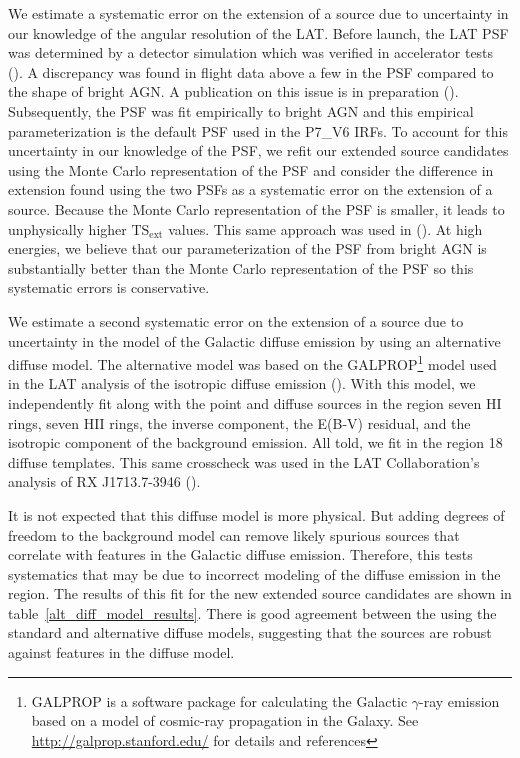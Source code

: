 \documentclass[12pt,preprint]{aastex}
\newcommand{\gev}{\text{GeV}\xspace}
\newcommand{\tsext}{{\ensuremath{\text{TS}_{\text{ext}}}}\xspace}
\newcommand{\ts}{\text{TS}\xspace}
\begin{document}
We estimate a systematic error on the extension of a source due to
uncertainty in our knowledge of the angular resolution of the LAT.  Before
launch, the LAT PSF was determined by a detector simulation which was
verified in accelerator tests (\cite{atwood_LAT_mission}).  A discrepancy
was found in flight data above a few \gev in the PSF compared to the
shape of bright AGN.  A publication on this issue is in preparation
(\cite{lat_on_orbit_psf}).  Subsequently, the PSF was fit empirically to
bright AGN and this empirical parameterization is the default PSF used
in the P7\_V6 IRFs.  To account for this uncertainty in our knowledge of
the PSF, we refit our extended source candidates using the Monte Carlo
representation of the PSF and consider the difference in extension found
using the two PSFs as a systematic error on the extension of a source.
Because the Monte Carlo representation of the PSF is smaller, it leads
to unphysically higher \tsext values.  This same approach was used in
(\cite{ic443}).  At high energies, we believe that our parameterization
of the PSF from bright AGN is substantially better than the Monte Carlo
representation of the PSF so this systematic errors is conservative.


We estimate a second systematic error on the extension of a source
due to uncertainty in the model of the Galactic diffuse emission by
using an alternative diffuse model. The alternative model was based on
the GALPROP\footnote{GALPROP is a software package for calculating the
Galactic $\gamma$-ray emission based on a model of cosmic-ray propagation
in the Galaxy. See \url{http://galprop.stanford.edu/} for details and
references} model used in the LAT analysis of the isotropic diffuse
emission (\cite{isotropic_lat}).  With this model, we independently fit
along with the point and diffuse sources in the region seven HI rings,
seven HII rings, the inverse component, the E(B-V) residual, and the
isotropic component of the background emission.  All told, we fit in
the region 18 diffuse templates.  This same crosscheck was used in the
LAT Collaboration's analysis of RX J1713.7-3946 (\cite{rx_j1713_lat}).

It is not expected that this diffuse model is more physical.
But adding degrees of freedom to the background model can remove
likely spurious sources that correlate with features in the Galactic
diffuse emission.  Therefore, this tests systematics that may be
due to incorrect modeling of the diffuse emission in the region.
The results of this fit for the new extended source candidates are shown
in table~\ref{alt_diff_model_results}. There is good agreement between
the \ts using the standard and alternative diffuse models, suggesting
that the sources are robust against features in the diffuse model.
\end{document}
